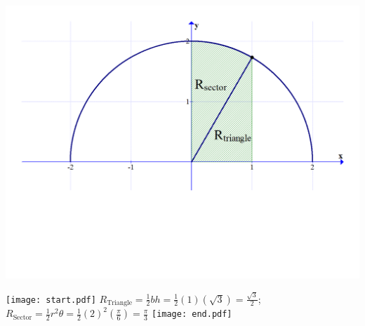 \documentclass[12pt]{article}
\begin{document}
\begin{enumerate}
\begin{enumerate}
\begin{center}
\includegraphics[scale=0.4]{area2.pdf}
\end{center}

\texttt{[image: start.pdf]}
{{$R_{\text{Triangle}}=\frac{1}{2}bh=\frac{1}{2}(1)\left(\sqrt{3}\right)=\frac{\sqrt{3}}{2}$; $R_{\text{Sector}}=\frac{1}{2}r^2\theta=\frac{1}{2}(2)^2\left(\frac{\pi}{6}\right)=\frac{\pi}{3}$}}
\texttt{[image: end.pdf]}


\end{enumerate}

\end{enumerate}
\end{document}
